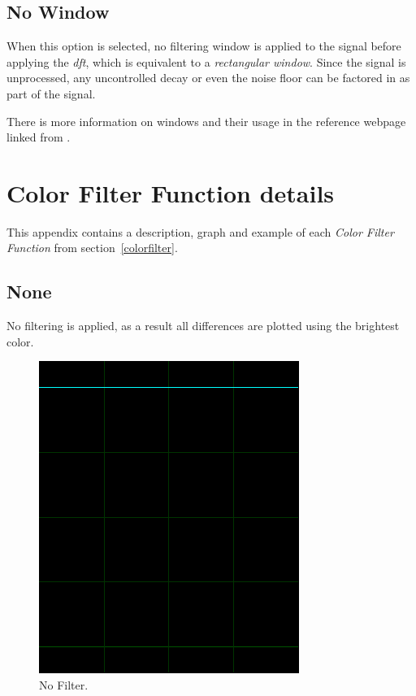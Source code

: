\documentclass[10pt,a4paper]{report}
\newcommand{\ac}[1]{\textit{\mbox{\acrshort{#1}}}}
\begin{document}
\begin{appendices}
\section{No Window}

When this option is selected, no filtering window is applied to the signal before applying the \ac{dft}, which is equivalent to a \textit{rectangular window}. Since the signal is unprocessed, any uncontrolled decay or even the noise floor can be factored in as part of the signal.

There is more information on windows and their usage in the reference webpage linked from \cite{windowtypes}.

\chapter{Color Filter Function details}
\label{filterfunctions}

This appendix contains a description, graph and example of each \textit{Color Filter Function} from section~\ref{colorfilter}.

\section{None} 

No filtering is applied, as a result all differences are plotted using the brightest color. 

\begin{figure}[H]
	\centering
	\includegraphics[width=0.4\linewidth]{images/colorfilter/BetaFunctionPlot_0.png}
	\caption[No Filter]{No Filter.}
	\label{fig:betafunctionplot0}
\end{figure}


\end{appendices}
\end{document}
